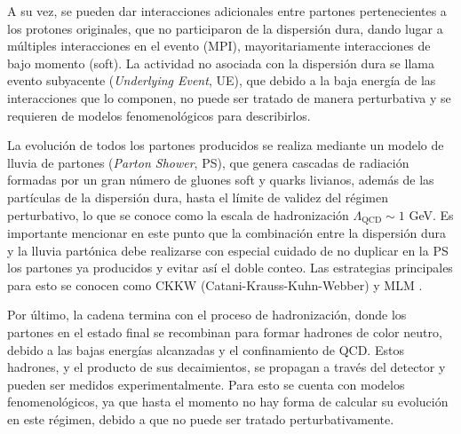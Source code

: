 A su vez, se pueden dar interacciones adicionales entre partones pertenecientes a los protones originales, que no participaron de la dispersión dura, dando lugar a múltiples
interacciones en el evento (MPI), mayoritariamente interacciones de bajo momento
(soft). La actividad no asociada con la dispersión dura se llama evento subyacente
(\textit{Underlying Event}, UE), que debido a la baja energía de las interacciones que lo
componen, no puede ser tratado de manera perturbativa y se requieren de modelos
fenomenológicos para describirlos.

La evolución de todos los partones producidos se realiza mediante un modelo
de lluvia de partones (\textit{Parton Shower}, PS), que genera cascadas de radiación formadas por un gran
número de gluones soft y quarks livianos, además de las partículas de la dispersión
dura, hasta el límite de validez del régimen perturbativo, lo que se conoce como la
escala de hadronización $\Lambda_{\text{QCD}}\sim 1$ GeV. Es importante mencionar en este punto
que la combinación entre la dispersión dura y la lluvia partónica debe realizarse
con especial cuidado de no duplicar en la PS los partones ya producidos y evitar
así el doble conteo. Las estrategias principales para esto se conocen como CKKW
(Catani-Krauss-Kuhn-Webber) \cite{ckkw_1, ckkw_2} y MLM \cite{mlm}.

Por último, la cadena termina con el proceso de hadronización, donde los partones en el estado final se recombinan para formar hadrones de color neutro, debido a
las bajas energías alcanzadas y el confinamiento de QCD. Estos hadrones, y el producto de sus decaimientos, se propagan a través del detector y pueden ser medidos
experimentalmente. Para esto se cuenta con modelos fenomenológicos, ya que hasta
el momento no hay forma de calcular su evolución en este régimen, debido a que no
puede ser tratado perturbativamente.

